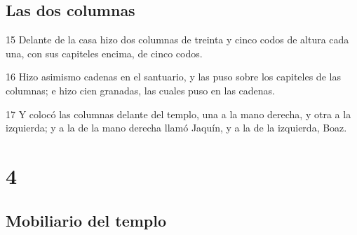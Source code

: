 \section*{Las dos columnas }

\par 15 Delante de la casa hizo dos columnas de treinta y cinco codos   de altura cada una, con sus capiteles encima, de cinco codos.
\par 16 Hizo asimismo cadenas en el santuario, y las puso sobre los capiteles de las columnas; e hizo cien granadas, las cuales puso en las cadenas.
\par 17 Y colocó las columnas delante del templo, una a la mano derecha, y otra a la izquierda; y a la de la mano derecha llamó Jaquín, y a la de la izquierda, Boaz.

\chapter{4}

\section*{Mobiliario del templo }

